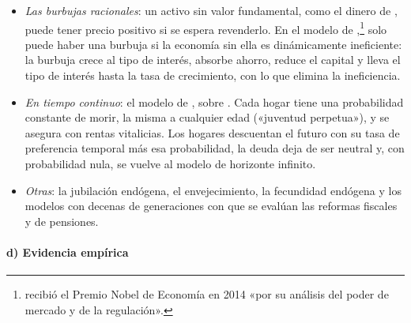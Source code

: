 \documentclass[11pt]{article}
\begin{document}
\begin{itemize}
  \begin{figure}[H]
  \centering
  \caption{Envejecimiento y pensiones: tasa de dependencia de mayores (España y UE-27, 1960-2100) y gasto público en pensiones (2022-2070)}\label{fig:demografia-pensiones}
  \end{figure}
\item \emph{Las burbujas racionales}: un activo sin valor fundamental, como el dinero de , puede tener precio positivo si se espera revenderlo. En el modelo de \textcite{Tirole1985Asset},\footnote{ recibió el Premio Nobel de Economía en 2014 «por su análisis del poder de mercado y de la regulación»\nocite{Nobel2014Tirole}.} solo puede haber una burbuja si la economía sin ella es dinámicamente ineficiente: la burbuja crece al tipo de interés, absorbe ahorro, reduce el capital y lleva el tipo de interés hasta la tasa de crecimiento, con lo que elimina la ineficiencia.
\item \emph{En tiempo continuo}: el modelo de \textcite{Blanchard1985Debt}, sobre \textcite{Yaari1965Uncertain}. Cada hogar tiene una probabilidad constante de morir, la misma a cualquier edad («juventud perpetua»), y se asegura con rentas vitalicias. Los hogares descuentan el futuro con su tasa de preferencia temporal más esa probabilidad, la deuda deja de ser neutral y, con probabilidad nula, se vuelve al modelo de horizonte infinito.
\item \emph{Otras}: la jubilación endógena\nocite{Feldstein1974Social}, el envejecimiento\nocite{Weil1997Economics}, la fecundidad endógena\nocite{LapanEnders1990Endogenous} y los modelos con decenas de generaciones con que se evalúan las reformas fiscales y de pensiones\nocite{AuerbachKotlikoff1987Dynamic}.
\end{itemize}

\paragraph{d) Evidencia empírica}
\end{document}
